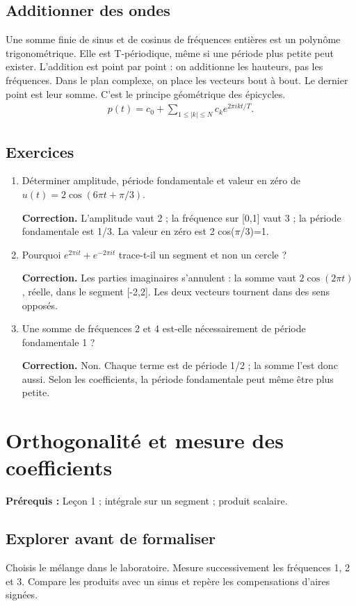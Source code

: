 \documentclass[11pt,a4paper]{article}
\begin{document}
\subsection{Additionner des ondes}
Une somme finie de sinus et de cosinus de fréquences entières est un polynôme trigonométrique. Elle est T-périodique, même si une période plus petite peut exister. L’addition est point par point : on additionne les hauteurs, pas les fréquences. Dans le plan complexe, on place les vecteurs bout à bout. Le dernier point est leur somme. C’est le principe géométrique des épicycles.
\[\begin{gathered}p(t)=c_0+\sum_{1\le |k|\le N} c_k e^{2\pi ikt/T}.\end{gathered}\]
\subsection*{Exercices}\begin{enumerate}
\item Déterminer amplitude, période fondamentale et valeur en zéro de $u(t)=2\cos(6\pi t+\pi/3)$.
\par\textbf{Correction.} L’amplitude vaut 2 ; la fréquence sur [0,1] vaut 3 ; la période fondamentale est 1/3. La valeur en zéro est 2 cos($\pi$/3)=1.
\item Pourquoi $e^{2\pi it}+e^{-2\pi it}$ trace-t-il un segment et non un cercle ?
\par\textbf{Correction.} Les parties imaginaires s’annulent : la somme vaut $2\cos(2\pi t)$, réelle, dans le segment [-2,2]. Les deux vecteurs tournent dans des sens opposés.
\item Une somme de fréquences 2 et 4 est-elle nécessairement de période fondamentale 1 ?
\par\textbf{Correction.} Non. Chaque terme est de période 1/2 ; la somme l’est donc aussi. Selon les coefficients, la période fondamentale peut même être plus petite.
\end{enumerate}
\clearpage
\section{Orthogonalité et mesure des coefficients}
\textbf{Prérequis :} Leçon 1 ; intégrale sur un segment ; produit scalaire.
\subsection*{Explorer avant de formaliser}Choisis le mélange dans le laboratoire. Mesure successivement les fréquences 1, 2 et 3. Compare les produits avec un sinus et repère les compensations d’aires signées.
\end{document}
